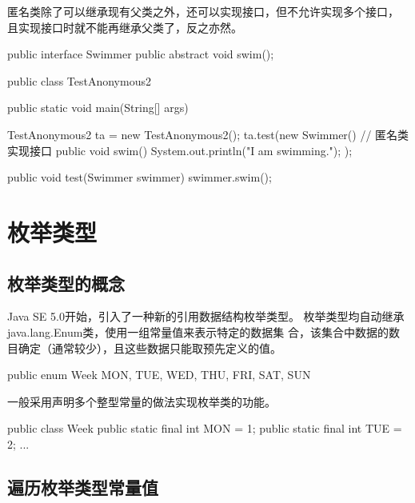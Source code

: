 匿名类除了可以继承现有父类之外，还可以实现接口，但不允许实现多个接口，
且实现接口时就不能再继承父类了，反之亦然。


\begin{javaCode}
  public interface Swimmer {
    public abstract void swim();
  }
\end{javaCode}


\begin{javaCode}
  public class TestAnonymous2 {
    public static void main(String[] args) {
      TestAnonymous2 ta = new TestAnonymous2();
      ta.test(new Swimmer() { // 匿名类实现接口
        public void swim() {
          System.out.println("I am swimming.");
        }
      });
      
      public void test(Swimmer swimmer) {
        swimmer.swim();
      }
    }
  }
\end{javaCode}


\section{枚举类型}

\subsection{枚举类型的概念}

Java SE 5.0开始，引入了一种新的引用数据结构{\hei\Red 枚举类型}。{\kai
  枚举类型均自动继承java.lang.Enum类，使用一组常量值来表示特定的数据集
  合，该集合中数据的数目确定（通常较少），且这些数据只能取预先定义的值。}

\begin{javaCode}
  public enum Week {
    MON, TUE, WED, THU, FRI, SAT, SUN
  }
\end{javaCode}


一般采用声明多个整型常量的做法实现枚举类的功能。

\begin{javaCode}
  public class Week {
    public static final int MON = 1;
    public static final int TUE = 2;
    ...
  }    
\end{javaCode}


\subsection{遍历枚举类型常量值}


